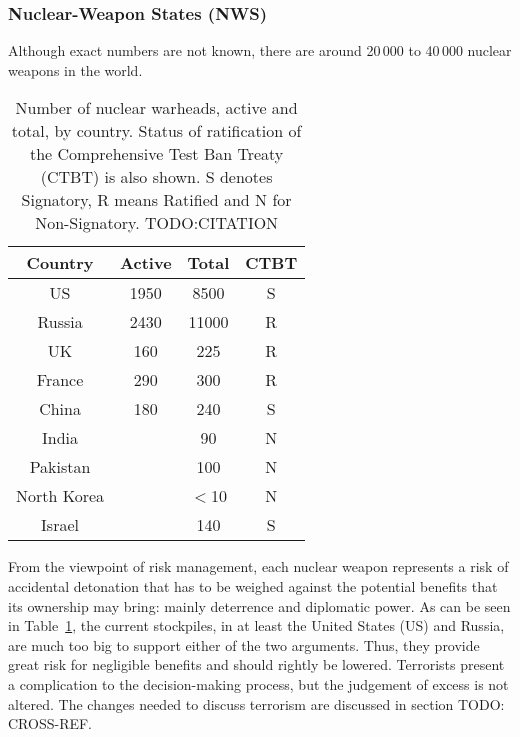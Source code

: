 \documentclass[twoside,titlepage,11pt,twocolumn,a4paper]{article}
\begin{document}
\subsubsection{Nuclear-Weapon States (NWS)}
Although exact numbers are not known, there are around 20\,000 to
40\,000 nuclear weapons in the world. \citep{worldNuclearForces2011,
  norris2010}

\begin{table}
  \begin{tabular}{|c|c|c|c|}
    \hline
    Country	& Active& Total		& CTBT	\\
    \hline
    US		& 1950 	& 8500		& S	\\
    Russia	& 2430 	& 11000		& R	\\
    UK		& 160 	& 225		& R	\\
    France	& 290	& 300		& R	\\
    China	& 180	& 240		& S	\\
    India	&	& 90		& N	\\
    Pakistan	&	& 100		& N	\\
    North Korea	&	& \(<\)10	& N	\\
    Israel	&	& 140		& S	\\
    \hline
  \end{tabular}
  \caption{Number of nuclear warheads, active and total, by
    country. Status of ratification of the Comprehensive Test Ban
    Treaty (CTBT) is also shown. S denotes Signatory, R means Ratified
    and N for Non-Signatory. TODO:CITATION}
  \label{tab:NWSwarheadsCTBT}
\end{table}

From the viewpoint of risk management, each nuclear weapon represents
a risk of accidental detonation that has to be weighed against the
potential benefits that its ownership may bring: mainly deterrence and
diplomatic power. As can be seen in Table~\ref{tab:NWSwarheadsCTBT},
the current stockpiles, in at least the United States (US) and Russia,
are much too big to support either of the two arguments. Thus, they
provide great risk for negligible benefits and should rightly be
lowered. Terrorists present a complication to the decision-making
process, but the judgement of excess is not altered. The changes
needed to discuss terrorism are discussed in section TODO: CROSS-REF.
\end{document}
